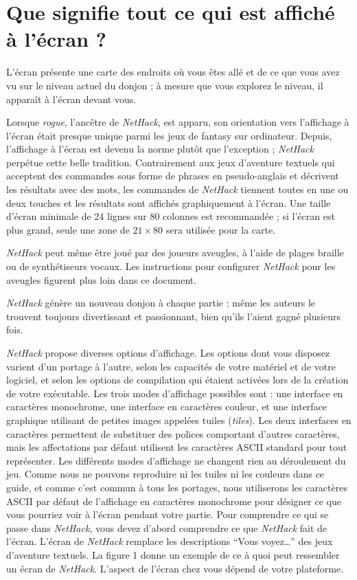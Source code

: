 \documentclass[titlepage]{article}
\begin{document}
\section{Que signifie tout ce qui est affiché à l'écran ?}
L'écran présente une carte des endroits où vous êtes allé et de ce que vous
avez vu sur le niveau actuel du donjon ; à mesure que vous explorez le niveau,
il apparaît à l'écran devant vous.

Lorsque \textit{rogue}, l'ancêtre de \textit{NetHack}, est apparu, son orientation
vers l'affichage à l'écran était presque unique parmi les jeux de fantasy
sur ordinateur.  Depuis, l'affichage à l'écran est devenu la norme plutôt
que l'exception ; \textit{NetHack} perpétue cette belle tradition.  Contrairement aux
jeux d'aventure textuels qui acceptent des commandes sous forme de phrases en
pseudo-anglais et décrivent les résultats avec des mots, les commandes de
\textit{NetHack} tiennent toutes en une ou deux touches et les résultats sont affichés
graphiquement à l'écran.  Une taille d'écran minimale de 24 lignes sur
80 colonnes est recommandée ; si l'écran est plus grand, seule une zone de
$21\times80$ sera utilisée pour la carte.

\textit{NetHack} peut même être joué par des joueurs aveugles, à l'aide de
plages braille ou de synthétiseurs vocaux.  Les instructions pour configurer
\textit{NetHack} pour les aveugles figurent plus loin dans ce document.

\textit{NetHack} génère un nouveau donjon à chaque partie ; même les
auteurs le trouvent toujours divertissant et passionnant, bien
qu'ils l'aient gagné plusieurs fois.

\textit{NetHack} propose diverses options d'affichage.  Les options dont vous
disposez varient d'un portage à l'autre, selon les capacités de votre matériel et de
votre logiciel, et selon les options de compilation qui étaient activées
lors de la création de votre exécutable.  Les trois modes d'affichage
possibles sont : une interface en caractères monochrome, une interface en
caractères couleur, et une interface graphique utilisant de petites images
appelées tuiles (\textit{tiles}).  Les deux interfaces en caractères permettent de
substituer des polices comportant d'autres caractères, mais les affectations
par défaut utilisent les caractères ASCII standard pour tout représenter.
Les différents modes d'affichage ne changent rien au déroulement du jeu.
Comme nous ne pouvons reproduire ni les tuiles ni les couleurs dans ce guide,
et comme c'est commun à tous les portages, nous utiliserons les caractères
ASCII par défaut de l'affichage en caractères monochrome pour désigner ce
que vous pourriez voir à l'écran pendant votre partie.
Pour comprendre ce qui se passe dans \textit{NetHack}, vous devez d'abord
comprendre ce que \textit{NetHack} fait de l'écran.  L'écran de \textit{NetHack}
remplace les descriptions ``Vous voyez\ldots'' des jeux d'aventure textuels.
La figure 1 donne un exemple de ce à quoi peut ressembler un écran de \textit{NetHack}.
L'aspect de l'écran chez vous dépend de votre plateforme.
\end{document}

